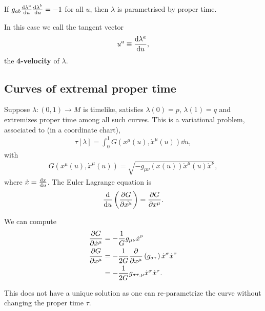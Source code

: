 If $g_{ab} \dv{\lambda^{a}}{u} \dv{\lambda^{b}}{u} = -1$ for all $u$, then $\lambda$ is parametrised by proper time.

In this case we call the tangent vector
\begin{align}
    u^{a} \equiv \dv{\lambda^{a}}{u}
,\end{align}
the \textbf{4-velocity} of $\lambda$.

\subsection{Curves of extremal proper time}

Suppose $\lambda : \left( 0,1 \right) \to M$ is timelike, satisfies $\lambda \left( 0 \right) = p$, $\lambda \left( 1 \right) = q$ and extremizes proper time among all such curves. This is a variational problem, associated to (in a coordinate chart),
\begin{align}
    \tau \left[ \lambda \right]  = \int_0^{1} G \left( x^{\mu}\left( u \right) , \dot{x}^{\mu}\left( u \right)  \right) \dd{u}
,\end{align}
with
\begin{align}
    G \left( x^{\mu}\left( u \right) , \dot{x}^{\mu}\left( u \right)  \right) = \sqrt{-g_{\mu \nu}\left( x\left( u \right)  \right) \dot{x}^{\mu}\left( u \right) \dot{x}^{\nu}} 
,\end{align}
where $\dot{x} = \dv{x}{u}$. The Euler Lagrange equation is
\begin{align}
    \dv{u} \left( \pdv{G}{\dot{x^{\mu}}} \right) = \pdv{G}{x^{\mu}}
.\end{align}

We can compute
\begin{align}
    \pdv{G}{\dot{x}^{\mu}} &= -\frac{1}{G} g_{\mu \nu} \dot{x}^{\nu} \\
    \pdv{G}{x^{\mu}} &= -\frac{1}{2G} \pdv{x^{\mu}}\left( g_{\sigma \tau} \right) \dot{x}^{\sigma} \dot{x}^{\tau} \\
    &= -\frac{1}{2G} g_{\sigma \tau, \mu} \dot{x}^{\sigma} \dot{x}^{\tau}
.\end{align}

This does not have a unique solution as one can re-parametrize the curve without changing the proper time $\tau$.

